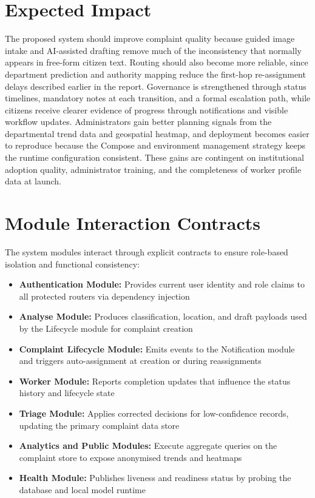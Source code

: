 \section{Expected Impact}

The proposed system should improve complaint quality because guided image intake and AI-assisted drafting remove much of the inconsistency that normally appears in free-form citizen text. Routing should also become more reliable, since department prediction and authority mapping reduce the first-hop re-assignment delays described earlier in the report. Governance is strengthened through status timelines, mandatory notes at each transition, and a formal escalation path, while citizens receive clearer evidence of progress through notifications and visible workflow updates. Administrators gain better planning signals from the departmental trend data and geospatial heatmap, and deployment becomes easier to reproduce because the Compose and environment management strategy keeps the runtime configuration consistent. These gains are contingent on institutional adoption quality, administrator training, and the completeness of worker profile data at launch.

\section{Module Interaction Contracts}

The system modules interact through explicit contracts to ensure role-based isolation and functional consistency:

\begin{itemize}
\item \textbf{Authentication Module:} Provides current user identity and role claims to all protected routers via dependency injection
\item \textbf{Analyse Module:} Produces classification, location, and draft payloads used by the Lifecycle module for complaint creation
\item \textbf{Complaint Lifecycle Module:} Emits events to the Notification module and triggers auto-assignment at creation or during reassignments
\item \textbf{Worker Module:} Reports completion updates that influence the status history and lifecycle state
\item \textbf{Triage Module:} Applies corrected decisions for low-confidence records, updating the primary complaint data store
\item \textbf{Analytics and Public Modules:} Execute aggregate queries on the complaint store to expose anonymised trends and heatmaps
\item \textbf{Health Module:} Publishes liveness and readiness status by probing the database and local model runtime
\end{itemize}

